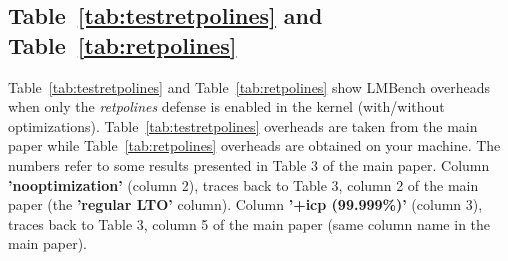 \documentclass{article}
\begin{document}
\newpage
\subsection{Table~\ref{tab:testretpolines} and Table~\ref{tab:retpolines}}

Table~\ref{tab:testretpolines} and Table~\ref{tab:retpolines} show LMBench overheads when only the \emph{retpolines} defense is
enabled in the kernel (with/without optimizations). Table~\ref{tab:testretpolines} overheads are taken from the main paper while
Table~\ref{tab:retpolines} overheads are obtained on your machine. The numbers refer to some results presented in Table 3 of the main
paper. Column \textbf{'nooptimization'} (column 2), traces back to Table 3, column 2 of the main paper (the \textbf{'regular LTO'} column).
Column \textbf{'+icp (99.999\%)'} (column 3), traces back to Table 3, column 5 of the main paper (same column name in the main paper).

\begin{table}[H]
\begin{center}
\begin{adjustbox}{width=0.5\textwidth}
\large

\end{adjustbox}
\end{center}
\label{tab:testretpolines} 
\end{table}

\begin{table}[H]
\begin{center}
\begin{adjustbox}{width=0.5\textwidth}
\large

\end{adjustbox}
\end{center}
\label{tab:retpolines} 
\end{table}

\newpage
\end{document}
